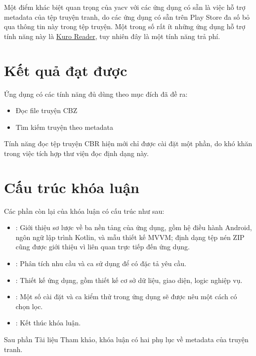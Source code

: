 \documentclass[../../thesis]{subfiles}
\begin{document}
Một điểm khác biệt quan trọng của yacv với các ứng dụng có sẵn là việc hỗ trợ
metadata của tệp truyện tranh, do các ứng dụng có sẵn trên Play Store đa số bỏ
qua thông tin này trong tệp truyện. Một trong số rất ít những ứng dụng hỗ trợ
tính năng này là \href{\KuroReader}{Kuro Reader}, tuy nhiên đây là một tính năng
trả phí.



\section{Kết quả đạt được}\label{sec:resulted-app}

Ứng dụng có các tính năng đủ dùng theo mục đích đã đề ra:

\begin{itemize}
    \item
        Đọc file truyện CBZ
    \item
        Tìm kiếm truyện theo metadata
\end{itemize}

Tính năng đọc tệp truyện CBR hiện mới chỉ được cài đặt một phần, do khó khăn
trong việc tích hợp thư viện đọc định dạng này.



\section{Cấu trúc khóa luận}\label{sec:outline}

Các phần còn lại của khóa luận có cấu trúc như sau:

\begin{itemize}
    \item
        : Giới thiệu sơ lược về ba nền tảng của ứng
        dụng, gồm hệ điều hành Android, ngôn ngữ lập trình Kotlin, và mẫu thiết
        kế MVVM; định dạng tệp nén ZIP cũng được giới thiệu vì liên quan trực
        tiếp đến ứng dụng.
    \item
        : Phân tích nhu cầu và ca sử dụng để có đặc
        tả yêu cầu.
    \item
        : Thiết kế ứng dụng, gồm thiết kế cơ sở dữ liệu,
        giao diện, logic nghiệp vụ.
    \item
        : Một số cài đặt và ca kiểm thử trong ứng
        dụng sẽ được nêu một cách có chọn lọc.
    \item
        : Kết thúc khóa luận.
\end{itemize}

Sau phần Tài liệu Tham khảo, khóa luận có hai phụ lục về metadata của truyện
tranh.
\end{document}
